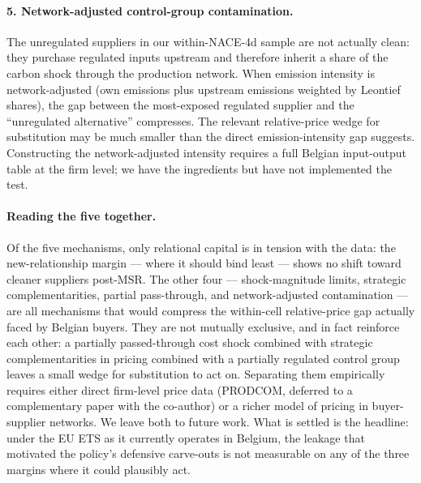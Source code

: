 \paragraph{5. Network-adjusted control-group contamination.} The unregulated suppliers in our within-NACE-4d sample are not actually clean: they purchase regulated inputs upstream and therefore inherit a share of the carbon shock through the production network. When emission intensity is network-adjusted (own emissions plus upstream emissions weighted by Leontief shares), the gap between the most-exposed regulated supplier and the ``unregulated alternative'' compresses. The relevant relative-price wedge for substitution may be much smaller than the direct emission-intensity gap suggests. Constructing the network-adjusted intensity requires a full Belgian input-output table at the firm level; we have the ingredients but have not implemented the test.

\paragraph{Reading the five together.} Of the five mechanisms, only relational capital is in tension with the data: the new-relationship margin --- where it should bind least --- shows no shift toward cleaner suppliers post-MSR. The other four --- shock-magnitude limits, strategic complementarities, partial pass-through, and network-adjusted contamination --- are all mechanisms that would compress the within-cell relative-price gap actually faced by Belgian buyers. They are not mutually exclusive, and in fact reinforce each other: a partially passed-through cost shock combined with strategic complementarities in pricing combined with a partially regulated control group leaves a small wedge for substitution to act on. Separating them empirically requires either direct firm-level price data (PRODCOM, deferred to a complementary paper with the co-author) or a richer model of pricing in buyer-supplier networks. We leave both to future work. What is settled is the headline: under the EU ETS as it currently operates in Belgium, the leakage that motivated the policy's defensive carve-outs is not measurable on any of the three margins where it could plausibly act.
